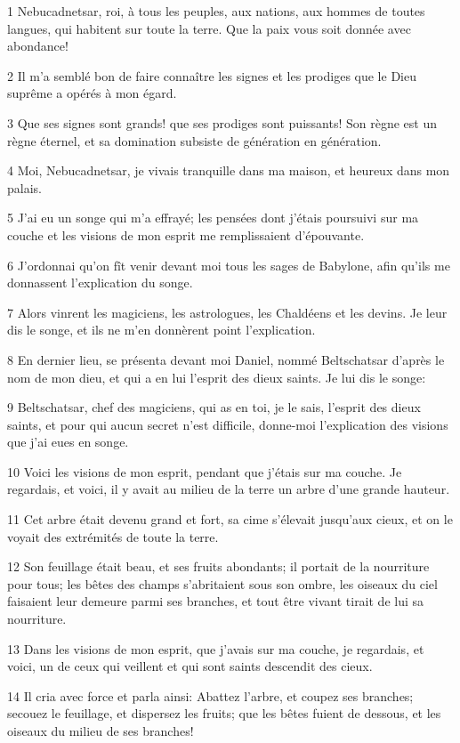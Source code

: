 \par 1 Nebucadnetsar, roi, à tous les peuples, aux nations, aux hommes de toutes langues, qui habitent sur toute la terre. Que la paix vous soit donnée avec abondance!
\par 2 Il m'a semblé bon de faire connaître les signes et les prodiges que le Dieu suprême a opérés à mon égard.
\par 3 Que ses signes sont grands! que ses prodiges sont puissants! Son règne est un règne éternel, et sa domination subsiste de génération en génération.
\par 4 Moi, Nebucadnetsar, je vivais tranquille dans ma maison, et heureux dans mon palais.
\par 5 J'ai eu un songe qui m'a effrayé; les pensées dont j'étais poursuivi sur ma couche et les visions de mon esprit me remplissaient d'épouvante.
\par 6 J'ordonnai qu'on fît venir devant moi tous les sages de Babylone, afin qu'ils me donnassent l'explication du songe.
\par 7 Alors vinrent les magiciens, les astrologues, les Chaldéens et les devins. Je leur dis le songe, et ils ne m'en donnèrent point l'explication.
\par 8 En dernier lieu, se présenta devant moi Daniel, nommé Beltschatsar d'après le nom de mon dieu, et qui a en lui l'esprit des dieux saints. Je lui dis le songe:
\par 9 Beltschatsar, chef des magiciens, qui as en toi, je le sais, l'esprit des dieux saints, et pour qui aucun secret n'est difficile, donne-moi l'explication des visions que j'ai eues en songe.
\par 10 Voici les visions de mon esprit, pendant que j'étais sur ma couche. Je regardais, et voici, il y avait au milieu de la terre un arbre d'une grande hauteur.
\par 11 Cet arbre était devenu grand et fort, sa cime s'élevait jusqu'aux cieux, et on le voyait des extrémités de toute la terre.
\par 12 Son feuillage était beau, et ses fruits abondants; il portait de la nourriture pour tous; les bêtes des champs s'abritaient sous son ombre, les oiseaux du ciel faisaient leur demeure parmi ses branches, et tout être vivant tirait de lui sa nourriture.
\par 13 Dans les visions de mon esprit, que j'avais sur ma couche, je regardais, et voici, un de ceux qui veillent et qui sont saints descendit des cieux.
\par 14 Il cria avec force et parla ainsi: Abattez l'arbre, et coupez ses branches; secouez le feuillage, et dispersez les fruits; que les bêtes fuient de dessous, et les oiseaux du milieu de ses branches!
